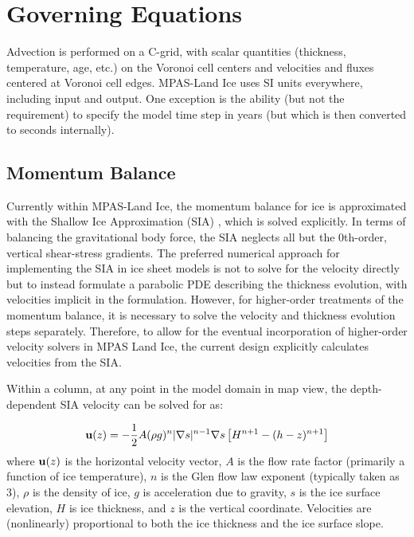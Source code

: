 \chapter{Governing Equations}
\label{chap:landice-intro}



Advection is performed on a C-grid, with scalar quantities (thickness, temperature, age, etc.) on the Voronoi cell centers and velocities and fluxes centered at Voronoi cell edges.  MPAS-Land Ice uses SI units everywhere, including input and output.  One exception is the ability (but not the requirement) to specify the model time step in years (but which is then converted to seconds internally).

\section{Momentum Balance}

Currently within MPAS-Land Ice, the momentum balance for ice is approximated with the Shallow Ice Approximation (SIA) \citep{Hutter1983}, which is solved explicitly.  In terms of balancing the gravitational body force, the SIA neglects all but the 0th-order, vertical shear-stress gradients.  The preferred numerical approach for implementing the SIA in ice sheet models is not to solve for the velocity directly but to instead formulate a parabolic PDE describing the thickness evolution, with velocities implicit in the formulation.  However, for higher-order treatments of the momentum balance, it is necessary to solve the velocity and thickness evolution steps separately. Therefore, to allow for the eventual incorporation of higher-order velocity solvers in MPAS Land Ice, the current design explicitly calculates velocities from the SIA.

Within a column, at any point in the model domain in map view, the depth-dependent SIA velocity can be solved for as:

\begin{equation}
    \label{sia}
	\mathbf{u}(z) = -\frac{1}{2} A (\rho g )^n |\nabla s|^{n-1} \nabla s \left[H^{n+1} - (h-z)^{n+1} \right]
\end{equation}
where $\mathbf{u}(z)$ is the horizontal velocity vector, $A$ is the flow rate factor (primarily a function of ice temperature), $n$ is the Glen flow law exponent (typically taken as 3), $\rho$ is the density of ice, $g$ is acceleration due to gravity, $s$ is the ice surface elevation, $H$ is ice thickness, and $z$ is the vertical coordinate. Velocities are (nonlinearly) proportional to both the ice thickness and the ice surface slope.

